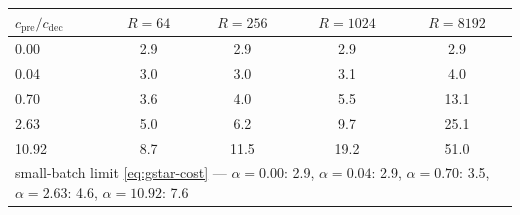 \begin{tabular}{lcccc}
\toprule
$c_{\mathrm{pre}}/c_{\mathrm{dec}}$ & $R=64$ & $R=256$ & $R=1024$ & $R=8192$ \\
\midrule
0.00 & 2.9 & 2.9 & 2.9 & 2.9 \\
0.04 & 3.0 & 3.0 & 3.1 & 4.0 \\
0.70 & 3.6 & 4.0 & 5.5 & 13.1 \\
2.63 & 5.0 & 6.2 & 9.7 & 25.1 \\
10.92 & 8.7 & 11.5 & 19.2 & 51.0 \\
\midrule
\multicolumn{5}{l}{\footnotesize small-batch limit \eqref{eq:gstar-cost} --- $\alpha=0.00$: 2.9, $\alpha=0.04$: 2.9, $\alpha=0.70$: 3.5, $\alpha=2.63$: 4.6, $\alpha=10.92$: 7.6} \\
\bottomrule
\end{tabular}